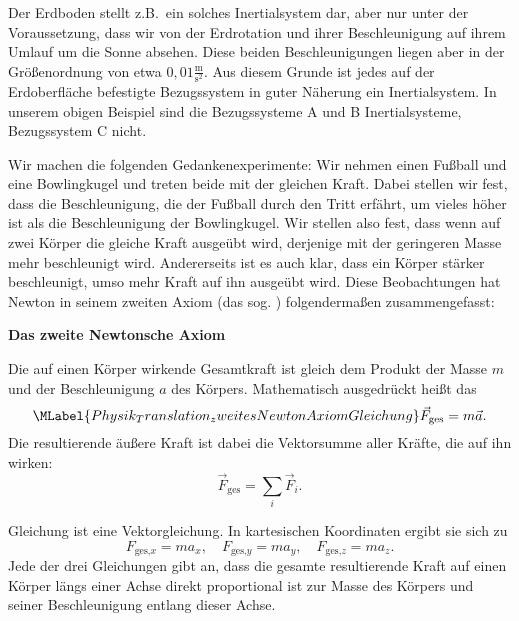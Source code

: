 \begin{MContent}
               Der Erdboden stellt z.B.~ein solches Inertialsystem dar, aber nur unter der Voraussetzung, dass wir von der Erdrotation und ihrer Beschleunigung auf ihrem Umlauf um die Sonne absehen. Diese beiden Beschleunigungen liegen aber in der Gr\"o{\ss}enordnung von etwa ${0,01}\frac{\text{m}}{\text{s}^2}$. Aus diesem Grunde ist jedes auf der Erdoberfl\"ache befestigte Bezugssystem in guter N\"aherung ein Inertialsystem. In unserem obigen Beispiel sind die Bezugssysteme A und B Inertialsysteme, Bezugssystem C nicht.
              
               
               
               
               Wir machen die folgenden Gedankenexperimente: Wir nehmen einen Fu{\ss}ball und eine Bowlingkugel und treten beide mit der gleichen Kraft. Dabei stellen wir fest, dass die Beschleunigung, die der Fu{\ss}ball durch den Tritt erf\"ahrt, um vieles h\"oher ist als die Beschleunigung der Bowlingkugel. Wir stellen also fest, dass wenn auf zwei K\"orper die gleiche Kraft ausge\"ubt wird, derjenige mit der geringeren Masse mehr beschleunigt wird. Andererseits ist es auch klar, dass ein K\"orper st\"arker beschleunigt, umso mehr Kraft auf ihn ausge\"ubt wird. Diese Beobachtungen hat Newton in seinem zweiten Axiom (das sog. ) folgenderma{\ss}en zusammengefasst:
               
               \begin{MInfo} 
              \textbf{Das zweite Newtonsche Axiom}
               
               
               Die auf einen K\"orper wirkende Gesamtkraft ist gleich dem Produkt der Masse $m$ und der Beschleunigung $a$ des K\"orpers. Mathematisch ausgedr\"uckt hei{\ss}t das
               \begin{equation}\MLabel{Physik_Translation_zweitesNewtonAxiomGleichung}
               \vec{F}_{\text{ges}}=m\vec{a}.
               \end{equation} Die resultierende \"au{\ss}ere Kraft ist dabei die Vektorsumme aller Kr\"afte, die auf ihn wirken:
               $$
               \vec{F}_{\text{ges}}=\sum_i \vec{F}_i.
               $$
               \end{MInfo}
               
               Gleichung  ist eine Vektorgleichung. In kartesischen Koordinaten ergibt sie sich zu
               $$
               F_{\text{ges,$x$}}=ma_x,\quad F_{\text{ges,$y$}}=ma_y, \quad F_{\text{ges,$z$}}=ma_z.
                $$ Jede der drei Gleichungen gibt an, dass die gesamte resultierende Kraft auf einen K\"orper l\"angs einer Achse direkt proportional ist zur Masse des K\"orpers und seiner Beschleunigung entlang dieser Achse.\\
                
               \end{MContent} 
               
